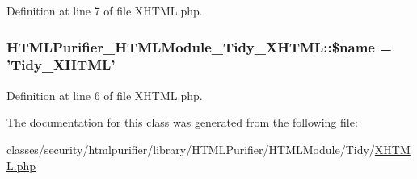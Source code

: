 Definition at line 7 of file X\+H\+T\+M\+L.\+php.

\hypertarget{classHTMLPurifier__HTMLModule__Tidy__XHTML_a42cf1efb51b320104529733b00e82c53}{
\subsubsection[{\$name}]{\setlength{\rightskip}{0pt plus 5cm}H\+T\+M\+L\+Purifier\+\_\+\+H\+T\+M\+L\+Module\+\_\+\+Tidy\+\_\+\+X\+H\+T\+M\+L\+::\$name = 'Tidy\+\_\+\+X\+H\+T\+M\+L'}}\label{classHTMLPurifier__HTMLModule__Tidy__XHTML_a42cf1efb51b320104529733b00e82c53}


Definition at line 6 of file X\+H\+T\+M\+L.\+php.



The documentation for this class was generated from the following file\+:\begin{DoxyCompactItemize}
\item 
classes/security/htmlpurifier/library/\+H\+T\+M\+L\+Purifier/\+H\+T\+M\+L\+Module/\+Tidy/\hyperlink{XHTML_8php}{X\+H\+T\+M\+L.\+php}\end{DoxyCompactItemize}
